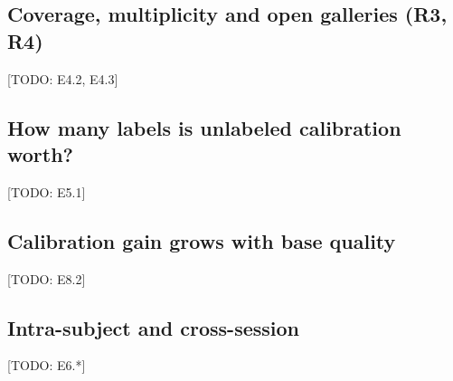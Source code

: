 \documentclass[10pt,twocolumn,letterpaper]{article}
\newcommand{\todo}[1]{{\color{red}[TODO: #1]}}
\begin{document}
\subsection{Coverage, multiplicity and open galleries (R3, R4)}
\todo{E4.2, E4.3}

\subsection{How many labels is unlabeled calibration worth?}
\todo{E5.1}

\subsection{Calibration gain grows with base quality}
\todo{E8.2}

\subsection{Intra-subject and cross-session}
\todo{E6.*}
\end{document}
